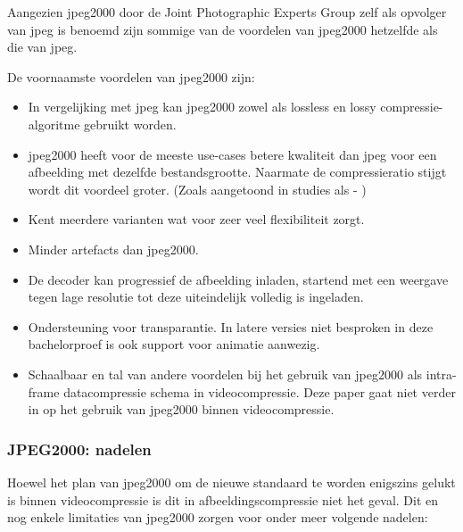 Aangezien \gls{jpeg2000} door de Joint Photographic Experts Group zelf als opvolger van \gls{jpeg} is benoemd zijn sommige van de voordelen van \gls{jpeg2000} hetzelfde als die van \gls{jpeg}.

De voornaamste voordelen van \gls{jpeg2000} zijn:

\begin{itemize}
	\item In vergelijking met \gls{jpeg} kan \gls{jpeg2000} zowel als \gls{lossless} en \gls{lossy} \gls{compressie-algoritme} gebruikt worden.
	
	\item \gls{jpeg2000} heeft voor de meeste \glspl{use-case} betere kwaliteit dan \gls{jpeg} voor een afbeelding met dezelfde bestandsgrootte. Naarmate de compressieratio stijgt wordt dit voordeel groter. (Zoals aangetoond in studies als  - \cite{jpegvsjpeg2000quality})
	
	\item Kent meerdere varianten wat voor zeer veel flexibiliteit zorgt.
	
	\item Minder \glspl{artefact} dan \gls{jpeg2000}.
	
	\item De  \gls{decoder} kan progressief de afbeelding inladen, startend met een weergave tegen lage resolutie tot deze uiteindelijk volledig is ingeladen.
	
	\item Ondersteuning voor transparantie. In latere versies niet besproken in deze bachelorproef is ook support voor animatie aanwezig.
	
	\item Schaalbaar en tal van andere voordelen bij het gebruik van \gls{jpeg2000} als \gls{intra-frame} \gls{datacompressie} schema in \gls{videocompressie}. Deze paper gaat niet verder in op het gebruik van \gls{jpeg2000} binnen \gls{videocompressie}.
\end{itemize}

\subsubsection{JPEG2000: nadelen}
\label{sec:afbeeldingscompressie-jpeg2000-nadelen}

Hoewel het plan van \gls{jpeg2000} om de nieuwe standaard te worden enigszins gelukt is binnen \gls{videocompressie} is dit in \gls{afbeeldingscompressie} niet het geval. Dit en nog enkele limitaties van \gls{jpeg2000} zorgen voor onder meer volgende nadelen:

